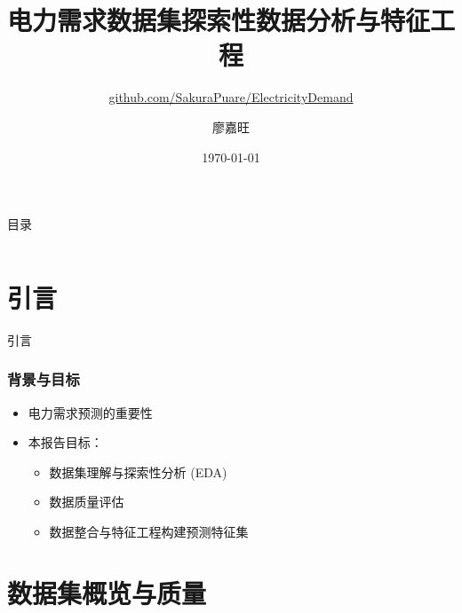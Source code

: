 \documentclass{beamer} %
\title{电力需求数据集探索性数据分析与特征工程} %
\subtitle{\href{https://github.com/SakuraPuare/ElectricityDemand}{github.com/SakuraPuare/ElectricityDemand}}
\author{廖嘉旺} %
\institute{Hubei University of Arts and Science}
\date{\today} %
\begin{document}
{
\frame{\titlepage}
}


\begin{frame}{目录}
    \begin{columns}[T,onlytextwidth]
        \begin{column}{0.5\textwidth}
            \tableofcontents[sections={1-4}]
        \end{column}
        \begin{column}{0.5\textwidth}
            \tableofcontents[sections={5-7}]
        \end{column}
    \end{columns}
\end{frame}


\section{引言}
\begin{frame}{引言}
    \frametitle{背景与目标}
    \begin{itemize}
        \item 电力需求预测的重要性
        \item 本报告目标：
        \begin{itemize}
            \item 数据集理解与探索性分析 (EDA)
            \item 数据质量评估
            \item 数据整合与特征工程构建预测特征集
        \end{itemize}
    \end{itemize}
\end{frame}

\section{数据集概览与质量}
\end{document}
